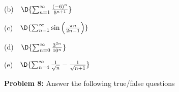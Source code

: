 \documentclass[12pt]{amsart}
\numberwithin{equation}{section}
\begin{document}
\vspace{3.0cm}

(b) \,\, $\D{\sum_{n=1}^\infty \frac{(- 6)^{n}}{5^{n+1}}}$

\vspace{3.0cm}

(c) \,\, $\D{\sum_{n=1}^\infty \sin\left(\frac{\pi n}{2n-1}\right)}$

\vspace{3.0cm}

(d) \,\, $\D{ \sum_{n=0}^{\infty} \frac{3^{2n}}{10^{n}}}$

\vspace{3.0cm}

(e) \,\, $\D{\sum_{n=4}^\infty \frac{1}{\sqrt{n}}-\frac{1}{\sqrt{n+1}}}$

\vspace{0.2cm}

\thispagestyle{empty}
\newpage
\thispagestyle{empty}

{\bf Problem 8:} Answer the following true/false questions

\vspace{0.4cm}
\end{document}
